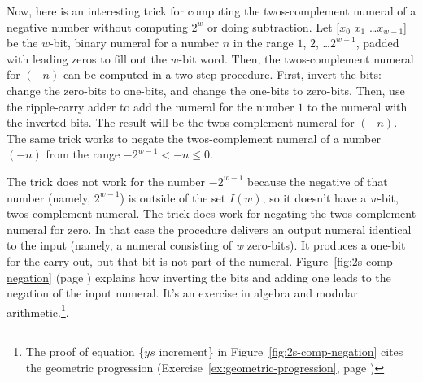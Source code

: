 Now, here is an interesting
trick
for computing the twos-complement numeral of a negative number without
computing $2^w$ or doing subtraction.
Let \textsf{[$x_0$ $x_1$ \dots $x_{w-1}$]}
be the $w$-bit, binary numeral for a number $n$ in the range $1$, $2$, \dots $2^{w-1}$,
padded with leading zeros to fill out the $w$-bit word.
Then, the twos-complement numeral for $(-n)$ can be computed
in a two-step procedure.
First, invert the bits: change the zero-bits to one-bits,
and change the one-bits to zero-bits.
Then, use the ripple-carry adder to add the numeral for the number $1$
to the numeral with the inverted bits.
The result will be the twos-complement numeral for $(-n)$.
The same trick works to negate the twos-complement numeral
of a number $(-n)$ from the range $-2^{w-1} < -n \leq 0$.

The trick does not work for the number $-2^{w-1}$
because the negative of that number (namely, $2^{w-1}$)
is outside of the set $I(w)$,
so it doesn't have a \emph{w}-bit, twos-complement numeral.
The trick does work for negating the twos-complement numeral for zero.
In that case the procedure delivers an output numeral identical
to the input (namely, a numeral consisting of \emph{w} zero-bits).
It produces a one-bit for the carry-out, but that bit is not part of the numeral.
Figure~\ref{fig:2s-comp-negation}
(page \pageref{fig:2s-comp-negation})
explains how inverting the bits and adding one leads to the negation
of the input numeral.
It's an exercise in algebra and modular arithmetic.\footnote{The
proof of equation \{$ys$ increment\}
in Figure~\ref{fig:2s-comp-negation}
cites the geometric progression
(Exercise~\ref{ex:geometric-progression}, page \pageref{ex:geometric-progression})}.

